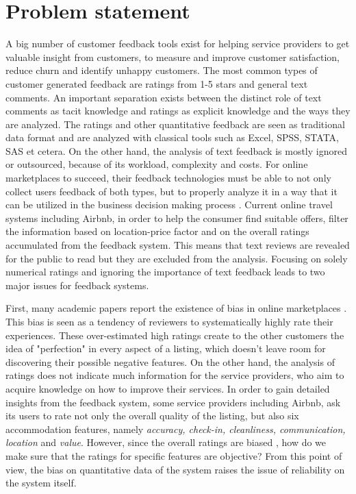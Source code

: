 \section{Problem statement}
%
A big number of customer feedback tools exist for helping service providers to get valuable insight from customers, to measure and improve customer satisfaction, reduce churn and identify unhappy customers. The most common types of customer generated feedback are ratings from 1-5 stars and general text comments. An important separation exists between the distinct role of text comments as tacit knowledge and ratings as explicit knowledge and the ways they are analyzed. The ratings and other quantitative feedback are seen as traditional data format and are analyzed with classical tools such as Excel, SPSS, STATA, SAS et cetera. On the other hand, the analysis of text feedback is mostly ignored or outsourced, because of its workload, complexity and costs. For online marketplaces to succeed, their feedback technologies must be able to not only collect users feedback of both types, but to properly analyze it in a way that it can be utilized in the business decision making process \cite{pavlou2006nature}. Current online travel systems including Airbnb, in order to help the consumer find suitable offers, filter the information based on location-price factor and on the overall ratings accumulated from the feedback system. This means that text reviews are revealed for the public to read but they are excluded from the analysis. Focusing on solely numerical ratings and ignoring the importance of text feedback leads to two major issues for feedback systems. 
%
%

First, many academic papers report the existence of bias in online marketplaces \cite{bolton2013engineering, dellarocas2008sound, dini2009buying, fradkin2016bias, ghose2011estimating, resnick2006value}. This bias is seen as a tendency of reviewers to systematically highly rate their experiences. These over-estimated high ratings create to the other customers the idea of "perfection" in every aspect of a listing, which doesn't leave room for discovering their possible negative features. On the other hand, the analysis of ratings does not indicate much information for the service providers, who aim to acquire knowledge on how to improve their services. In order to gain detailed insights from the feedback system, some service providers including Airbnb, ask its users to rate not only the overall quality of the listing, but also six accommodation features, namely \textit{accuracy, check-in, cleanliness, communication, location} and \textit{value}. However, since the overall ratings are biased \cite{fradkin2016bias}, how do we make sure that the ratings for specific features are objective? From this point of view, the bias on quantitative data of the system raises the issue of reliability on the system itself.

